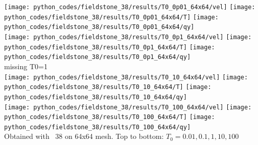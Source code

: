 \begin{center}
\texttt{[image: python\_codes/fieldstone\_38/results/T0\_0p01\_64x64/vel]}
\texttt{[image: python\_codes/fieldstone\_38/results/T0\_0p01\_64x64/T]}
\texttt{[image: python\_codes/fieldstone\_38/results/T0\_0p01\_64x64/qy]}\\
\texttt{[image: python\_codes/fieldstone\_38/results/T0\_0p1\_64x64/vel]}
\texttt{[image: python\_codes/fieldstone\_38/results/T0\_0p1\_64x64/T]}
\texttt{[image: python\_codes/fieldstone\_38/results/T0\_0p1\_64x64/qy]}\\
missing T0=1 \\
\texttt{[image: python\_codes/fieldstone\_38/results/T0\_10\_64x64/vel]}
\texttt{[image: python\_codes/fieldstone\_38/results/T0\_10\_64x64/T]}
\texttt{[image: python\_codes/fieldstone\_38/results/T0\_10\_64x64/qy]}\\
\texttt{[image: python\_codes/fieldstone\_38/results/T0\_100\_64x64/vel]}
\texttt{[image: python\_codes/fieldstone\_38/results/T0\_100\_64x64/T]}
\texttt{[image: python\_codes/fieldstone\_38/results/T0\_100\_64x64/qy]}\\
{\captionfont Obtained with \stone~38 on 64x64 mesh. 
Top to bottom: $T_0=0.01,0.1,1,10,100$}
\end{center}

